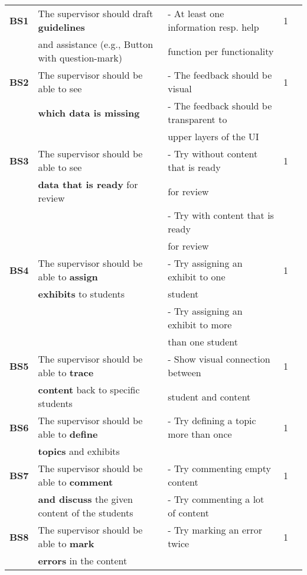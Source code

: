 {\begin{landscape}
\begin{center}
\begin{longtable}{|l|l|lll|}
\hline \hline
\endlastfoot
		\hline
	\textbf{BS1} 	& The supervisor should draft \textbf{guidelines} 		& - At least one information resp. help 	& 1	\\
	 		& and assistance (e.g., Button with question-mark)		& function per functionality 			& 		\\
	\hline
	\textbf{BS2} 	& The supervisor should be able to see 				&  - The feedback should be visual	& 1	\\
	 	& \textbf{which data is missing} 					&  - The feedback should be transparent to	& 	\\
		& 											& upper layers of the UI & \\
	\hline
	\textbf{BS3} 	& The supervisor should be able to see 				& - Try without content that is ready & 1\\
	 	& \textbf{data that is ready} for review 				&  for review & \\
		&											& - Try with content that is ready		& \\
		&											& for review		& \\
	\hline
	\textbf{BS4} 	& The supervisor should be able to \textbf{assign} 	& - Try assigning an exhibit to one & 1\\
	 	& \textbf{exhibits} to students 					& student  & \\
		&										& - Try assigning an exhibit to more	& \\
		&										&	than one student				& \\
	\hline
	\textbf{BS5} 	& The supervisor should be able to \textbf{trace} 		& - Show visual connection between	& 1\\
	 	& \textbf{content} back to specific students 			&  student and content 	& \\
	\hline
	\textbf{BS6} 	& The supervisor should be able to \textbf{define}  	&  - Try defining a topic more than once	& 1\\
	 	& \textbf{topics} and exhibits  				    		&  	& \\
	\hline
	\textbf{BS7} 	& The supervisor should be able to \textbf{comment} 		& - Try commenting empty content		& 1\\
		& \textbf{and discuss} the given content of the students 	&- Try commenting a lot of content		& \\	
	\hline
	\textbf{BS8} 	& The supervisor should be able to \textbf{mark} 	& - Try marking an error twice & 1\\
		& \textbf{errors} in the content					&	& \\

\end{longtable}
\end{center}
\end{landscape}}

